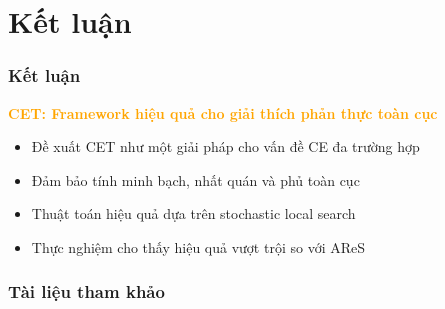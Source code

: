 \documentclass[notheorems, aspectratio=149]{beamer}
\begin{document}
\section{Kết luận}

\begin{frame}
    \frametitle{Kết luận}
    
    \begin{tcolorbox}[custombox]
        \centering
        \textbf{\textcolor{orange}{CET: Framework hiệu quả cho giải thích phản thực toàn cục}}
    \end{tcolorbox}

    \begin{itemize}
        \item Đề xuất CET như một giải pháp cho vấn đề CE đa trường hợp
        \item Đảm bảo tính minh bạch, nhất quán và phủ toàn cục
        \item Thuật toán hiệu quả dựa trên stochastic local search
        \item Thực nghiệm cho thấy hiệu quả vượt trội so với AReS
    \end{itemize}
\end{frame}

\begin{frame}[allowframebreaks]
\frametitle{Tài liệu tham khảo}
\small      
\raggedright 
\printbibliography
\end{frame}
\end{document}
